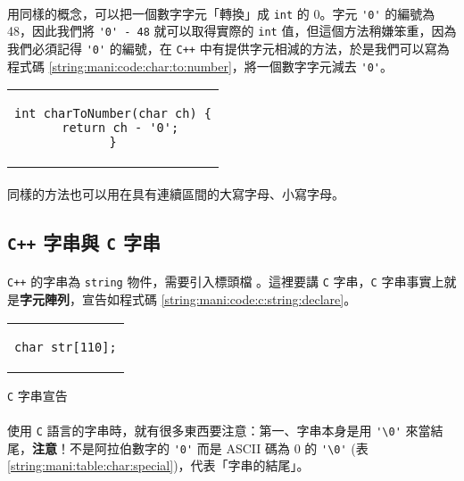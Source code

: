 \documentclass[12pt,a4paper,oneside]{report}
\begin{document}
\begin{CJK}{UTF8}{bkai}
\paragraph{}用同樣的概念，可以把一個數字字元「轉換」成 \lstinline!int! 的 0。字元 \lstinline!'0'! 的編號為 48，因此我們將 \lstinline!'0' - 48! 就可以取得實際的 \lstinline!int! 值，但這個方法稍嫌笨重，因為我們必須記得 \lstinline!'0'! 的編號，在 \texttt{C++} 中有提供字元相減的方法，於是我們可以寫為程式碼 \ref{string:mani:code:char:to:number}，將一個數字字元減去 \lstinline!'0'!。

\begin{code}[h!]
  \centering
  \begin{tabular}{c}
  \begin{lstlisting}
int charToNumber(char ch) {
  return ch - '0';
}
  \end{lstlisting}
  \end{tabular}
  \caption{數字字元轉換為 \lstinline!int!}
  \label{string:mani:code:char:to:number}
\end{code}

\paragraph{}同樣的方法也可以用在具有連續區間的大寫字母、小寫字母。

\subsection{\texttt{C++} 字串與 \texttt{C} 字串}

\paragraph{}\texttt{C++} 的字串為 \lstinline!string! 物件，需要引入標頭檔 。這裡要講 \texttt{C} 字串，\texttt{C} 字串事實上就是{\color{red}\textbf{字元陣列}}，宣告如程式碼 \ref{string:mani:code:c:string:declare}。

\begin{code}[h!]
  \centering
  \begin{tabular}{c}
  \begin{lstlisting}
char str[110];
  \end{lstlisting}
  \end{tabular}
  \caption{\texttt{C} 字串宣告}
  \label{string:mani:code:c:string:declare}
\end{code}

\paragraph{}使用 \texttt{C} 語言的字串時，就有很多東西要注意：第一、字串本身是用 \lstinline!'\0'! 來當結尾，{\color{red}\textbf{注意}}！不是阿拉伯數字的 \lstinline!'0'! 而是 ASCII 碼為 0 的 \lstinline!'\0'! (表 \ref{string:mani:table:char:special})，代表「字串的結尾」。


\end{CJK}
\end{document}
